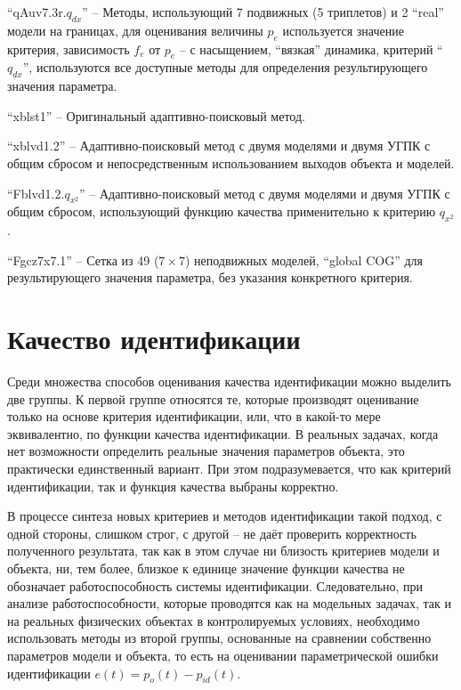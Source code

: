 ``qAuv7.3r.$q_{dx}$'' -- Методы, использующий 7 подвижных (5 триплетов) и 2 ``real'' модели на границах,
для оценивания величины $p_e$ используется значение критерия,
зависимость $f_e$ от $p_e$ -- с насыщением, ``вязкая'' динамика, критерий ``$q_{dx}$'',
используются все доступные методы для определения  результирующего значения параметра.

``xblst1'' -- Оригинальный адаптивно-поисковый метод.

``xblvd1.2'' -- Адаптивно-поисковый метод с двумя моделями и двумя УГПК с общим сбросом
 и непосредственным использованием выходов объекта и моделей.

``Fblvd1.2.$q_{x^2}$'' -- Адаптивно-поисковый метод с двумя моделями и двумя УГПК с общим сбросом,
 использующий функцию качества применительно к критерию $q_{x^2}$.

``Fgcz7x7.1'' -- Сетка из 49 ($7 \times 7$) неподвижных моделей,
``global COG'' для результирующего значения параметра,
без указания конкретного критерия.



\section{Качество идентификации}  %

Среди множества способов оценивания качества идентификации
можно выделить две группы.
К первой группе относятся те, которые производят оценивание
только на основе критерия идентификации, или,
что в какой-то мере эквивалентно, по функции качества идентификации.
В реальных задачах, когда нет возможности определить реальные значения
параметров объекта, это практически единственный вариант.
При этом подразумевается, что как критерий идентификации, так и
функция качества выбраны корректно.

В процессе синтеза новых критериев и методов идентификации
такой подход, с одной стороны, слишком строг,
с другой -- не даёт проверить корректность полученного результата,
так как в этом случае ни близость критериев модели и объекта,
ни, тем более, близкое к единице значение функции качества не
обозначает работоспособность системы идентификации.
Следовательно, при анализе работоспособности,
которые проводятся как на модельных задачах,
так и на реальных физических объектах в контролируемых
условиях, необходимо использовать методы из второй группы,
основанные на сравнении собственно параметров модели и объекта,
то есть на оценивании параметрической
ошибки идентификации $e(t)=p_o(t)-p_{id}(t)$.

